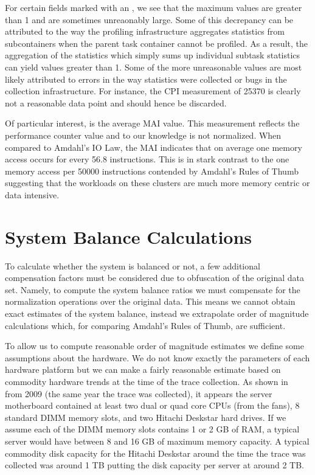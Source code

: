 \documentclass{sig-alternate}
\begin{document}
For certain fields marked with an \*, we see that the maximum values are greater than 1 and are sometimes unreaonably large.
Some of this decrepancy can be attributed to the way the profiling infrastructure aggregates statistics from subcontainers when the parent task container cannot be profiled.
As a result, the aggregation of the statistics which simply sums up individual subtask statistics can yield values greater than 1.
Some of the more unreasonable values are most likely attributed to errors in the way statistics were collected or bugs in the collection infrastructure.
For instance, the CPI measurement of 25370 is clearly not a reasonable data point and should hence be discarded.

Of particular interest, is the average MAI value.
This measurement reflects the performance counter value and to our knowledge is not normalized.
When compared to Amdahl's IO Law, the MAI indicates that on average one memory access occurs for every 56.8 instructions.
This is in stark contrast to the one memory access per 50000 instructions contended by Amdahl's Rules of Thumb suggesting that the workloads on these clusters are much more memory centric or data intensive.

\section{System Balance Calculations}

To calculate whether the system is balanced or not, a few additional compensation factors must be considered due to obfuscation of the original data set.
Namely, to compute the system balance ratios we must compensate for the normalization operations over the original data.
This means we cannot obtain exact estimates of the system balance, instead we extrapolate order of magnitude calculations which, for comparing Amdahl's Rules of Thumb, are sufficient.

To allow us to compute reasonable order of magnitude estimates we define some assumptions about the hardware.
We do not know exactly the parameters of each hardware platform but we can make a fairly reasonable estimate based on commodity hardware trends at the time of the trace collection.
As shown in ~\cite{googlehw} from 2009 (the same year the trace was collected), it appears the server motherboard contained at least two dual or quad core CPUs (from the fans), 8 standard DIMM memory slots, and two Hitachi Deskstar hard drives.
If we assume each of the DIMM memory slots contains 1 or 2 GB of RAM, a typical server would have between 8 and 16 GB of maximum memory capacity.
A typical commodity disk capacity for the Hitachi Deskstar around the time the trace was collected was around 1 TB putting the disk capacity per server at around 2 TB.
\end{document}

